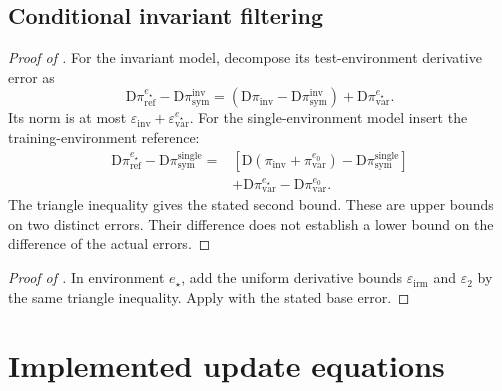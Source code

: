 \subsection{Conditional invariant filtering}
\label{app:proof_irm}

\begin{proof}[Proof of ]
For the invariant model, decompose its test-environment derivative error as
\[
\mathrm D\pi_{\mathrm{ref}}^{e_\star}
-\mathrm D\pi_{\mathrm{sym}}^{\mathrm{inv}}
=(\mathrm D\pi_{\mathrm{inv}}
-\mathrm D\pi_{\mathrm{sym}}^{\mathrm{inv}})
+\mathrm D\pi_{\mathrm{var}}^{e_\star}.
\]
Its norm is at most
\(\varepsilon_{\mathrm{inv}}+\varepsilon_{\mathrm{var}}^{e_\star}\).
For the single-environment model insert the training-environment reference:
\[
\begin{split}
\mathrm D\pi_{\mathrm{ref}}^{e_\star}
-\mathrm D\pi_{\mathrm{sym}}^{\mathrm{single}}
={}&[\mathrm D(\pi_{\mathrm{inv}}+\pi_{\mathrm{var}}^{e_0})
-\mathrm D\pi_{\mathrm{sym}}^{\mathrm{single}}]\\
&+\mathrm D\pi_{\mathrm{var}}^{e_\star}
-\mathrm D\pi_{\mathrm{var}}^{e_0}.
\end{split}
\]
The triangle inequality gives the stated second bound. These are upper bounds on two distinct errors. Their difference does not establish a lower bound on the difference of the actual errors.
\end{proof}

\begin{proof}[Proof of ]
In environment \(e_\star\), add the uniform derivative bounds
\(\varepsilon_{\mathrm{irm}}\) and \(\varepsilon_2\) by the same triangle inequality.
Apply  with the stated base error.
\end{proof}

\section{Implemented update equations}
\label{app:operator_detail}

